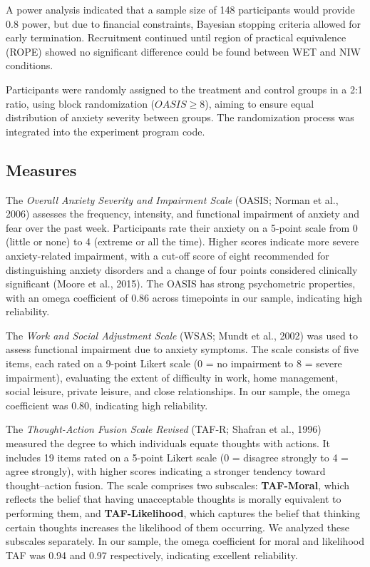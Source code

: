 \documentclass[
  man,floatsintext]{apa7}
\begin{document}
A power analysis indicated that a sample size of 148 participants would provide 0.8 power, but due to financial constraints, Bayesian stopping criteria allowed for early termination.
Recruitment continued until region of practical equivalence (ROPE) showed no significant difference could be found between WET and NIW conditions.

Participants were randomly assigned to the treatment and control groups in a 2:1 ratio, using block randomization (\(OASIS \geq 8\)), aiming to ensure equal distribution of anxiety severity between groups.
The randomization process was integrated into the experiment program code.

\subsection{Measures}\label{measures}

The \emph{Overall Anxiety Severity and Impairment Scale} (OASIS; Norman et al., 2006) assesses the frequency, intensity, and functional impairment of anxiety and fear over the past week.
Participants rate their anxiety on a 5-point scale from 0 (little or none) to 4 (extreme or all the time).
Higher scores indicate more severe anxiety-related impairment, with a cut-off score of eight recommended for distinguishing anxiety disorders and a change of four points considered clinically significant (Moore et al., 2015).
The OASIS has strong psychometric properties, with an omega coefficient of 0.86 across timepoints in our sample, indicating high reliability.

The \emph{Work and Social Adjustment Scale} (WSAS; Mundt et al., 2002) was used to assess functional impairment due to anxiety symptoms.
The scale consists of five items, each rated on a 9-point Likert scale (0 = no impairment to 8 = severe impairment), evaluating the extent of difficulty in work, home management, social leisure, private leisure, and close relationships.
In our sample, the omega coefficient was 0.80, indicating high reliability.

The \emph{Thought-Action Fusion Scale Revised} (TAF-R; Shafran et al., 1996) measured the degree to which individuals equate thoughts with actions.
It includes 19 items rated on a 5-point Likert scale (0 = disagree strongly to 4 = agree strongly), with higher scores indicating a stronger tendency toward thought--action fusion.
The scale comprises two subscales: \textbf{TAF-Moral}, which reflects the belief that having unacceptable thoughts is morally equivalent to performing them, and \textbf{TAF-Likelihood}, which captures the belief that thinking certain thoughts increases the likelihood of them occurring.
We analyzed these subscales separately.
In our sample, the omega coefficient for moral and likelihood TAF was 0.94 and 0.97 respectively, indicating excellent reliability.
\end{document}

